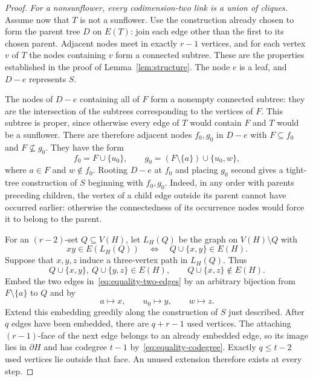 \documentclass[10pt,a4paper]{amsart}
\newcommand{\sh}{\partial}
\begin{document}
\begin{proof}
		\medskip\noindent
		\emph{For a nonsunflower, every codimension-two link is a union
			of cliques.}
		Assume now that $T$ is not a sunflower. Use the construction
		already chosen to form the parent tree $D$ on $E(T)$: join each
		edge other than the first to its chosen parent. Adjacent nodes
		meet in exactly $r-1$ vertices, and for each vertex $v$ of $T$
		the nodes containing $v$ form a connected subtree. These are
		the properties established in the proof of
		Lemma~\ref{lem:structure}. The node $e$ is a leaf, and $D-e$
		represents $S$.
		
		\bigskip
		
		The nodes of $D-e$ containing all of $F$ form a nonempty
		connected subtree: they are the intersection of the subtrees
		corresponding to the vertices of $F$. This subtree is proper,
		since otherwise every edge of $T$ would contain $F$ and $T$
		would be a sunflower. There are therefore adjacent nodes
		$f_0,g_0$ in $D-e$ with $F\subseteq f_0$ and
		$F\nsubseteq g_0$. They have the form
		\begin{equation}\label{eq:equality-two-edges}
			f_0=F\cup\{u_0\},
			\qquad
			g_0=(F\setminus\{a\})\cup\{u_0,w\},
		\end{equation}
		where $a\in F$ and $w\notin f_0$.
		Rooting $D-e$ at $f_0$ and placing $g_0$ second gives a
		tight-tree construction of $S$ beginning with $f_0,g_0$.
		Indeed, in any order with parents preceding children, the
		vertex of a child edge outside its parent cannot have occurred
		earlier: otherwise the connectedness of its occurrence nodes
		would force it to belong to the parent.
		
		\bigskip
		
		For an $(r-2)$-set $Q\subseteq V(H)$, let $L_H(Q)$ be the
		graph on $V(H)\setminus Q$ with
		\[
		xy\in E(L_H(Q))
		\quad\Longleftrightarrow\quad
		Q\cup\{x,y\}\in E(H).
		\]
		Suppose that $x,y,z$ induce a three-vertex path in $L_H(Q)$.
		Thus
		\begin{equation}\label{eq:equality-link-path}
			Q\cup\{x,y\},\ Q\cup\{y,z\}\in E(H),
			\qquad Q\cup\{x,z\}\notin E(H).
		\end{equation}
		Embed the two edges in~\eqref{eq:equality-two-edges} by an
		arbitrary bijection from $F\setminus\{a\}$ to $Q$ and by
		\[
		a\mapsto x,\qquad u_0\mapsto y,\qquad w\mapsto z.
		\]
		Extend this embedding greedily along the construction of $S$
		just described. After $q$ edges have been embedded, there are
		$q+r-1$ used vertices. The attaching $(r-1)$-face of the next
		edge belongs to an already embedded edge, so its image lies in
		$\sh H$ and has codegree $t-1$ by~\eqref{eq:equality-codegree}.
		Exactly $q\le t-2$ used vertices lie outside that face. An
		unused extension therefore exists at every step.
		

\end{proof}
\end{document}

